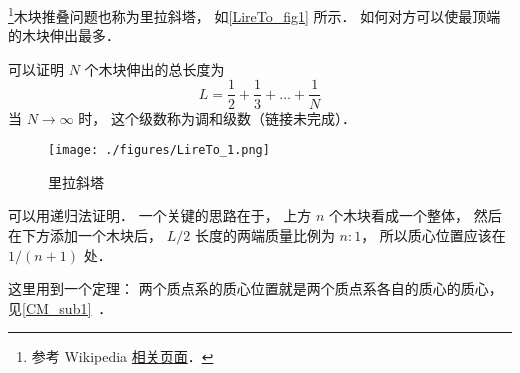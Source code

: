 
\begin{issues}
\issueDraft
\end{issues}


\footnote{参考 Wikipedia \href{https://en.wikipedia.org/wiki/Block-stacking_problem}{相关页面}．}木块推叠问题也称为里拉斜塔， 如\autoref{LireTo_fig1} 所示． 如何对方可以使最顶端的木块伸出最多．

可以证明 $N$ 个木块伸出的总长度为
\begin{equation}
L = \frac{1}{2} + \frac{1}{3} + \dots + \frac{1}{N}
\end{equation}
当 $N\to\infty$ 时， 这个级数称为调和级数（链接未完成）．

\begin{figure}[ht]
\centering
\texttt{[image: ./figures/LireTo\_1.png]}
\caption{里拉斜塔} \label{LireTo_fig1}
\end{figure}

可以用递归法证明． 一个关键的思路在于， 上方 $n$ 个木块看成一个整体， 然后在下方添加一个木块后， $L/2$ 长度的两端质量比例为 $n:1$， 所以质心位置应该在 $1/(n+1)$ 处．

这里用到一个定理： 两个质点系的质心位置就是两个质点系各自的质心的质心， 见\autoref{CM_sub1}~．


